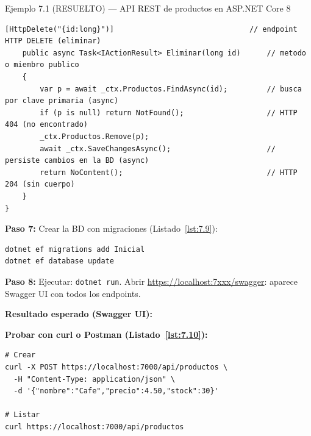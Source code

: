 \documentclass[11pt,a4paper,openany]{book}
\begin{document}
\begin{cajaejemplo}{Ejemplo 7.1 (RESUELTO) --- API REST de productos en ASP.NET Core 8}
\begin{lstlisting}[style=cs,caption={ProductosController.cs},label=lst:7.8]
    [HttpDelete("{id:long}")]                               // endpoint HTTP DELETE (eliminar)
    public async Task<IActionResult> Eliminar(long id)      // metodo o miembro publico
    {
        var p = await _ctx.Productos.FindAsync(id);         // busca por clave primaria (async)
        if (p is null) return NotFound();                   // HTTP 404 (no encontrado)
        _ctx.Productos.Remove(p);
        await _ctx.SaveChangesAsync();                      // persiste cambios en la BD (async)
        return NoContent();                                 // HTTP 204 (sin cuerpo)
    }
}
\end{lstlisting}

\textbf{Paso 7:} Crear la BD con migraciones (Listado~\ref{lst:7.9}):
\begin{lstlisting}[style=shell,numbers=none,caption={Ejemplo de Shell},label=lst:7.9]
dotnet ef migrations add Inicial
dotnet ef database update
\end{lstlisting}

\textbf{Paso 8:} Ejecutar: \texttt{dotnet run}. Abrir
\url{https://localhost:7xxx/swagger}: aparece Swagger UI con todos
los endpoints.

\textbf{Resultado esperado (Swagger UI):}


\textbf{Probar con curl o Postman (Listado~\ref{lst:7.10}):}
\begin{lstlisting}[style=shell,numbers=none,caption={Ejemplo de Shell},label=lst:7.10]
# Crear
curl -X POST https://localhost:7000/api/productos \
  -H "Content-Type: application/json" \
  -d '{"nombre":"Cafe","precio":4.50,"stock":30}'

# Listar
curl https://localhost:7000/api/productos
\end{lstlisting}
\end{cajaejemplo}
\end{document}
